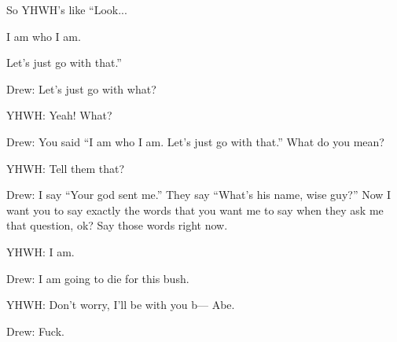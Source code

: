 {
}
{
}
{
	So YHWH's like ``Look...
	
	I am who I am.

	Let's just go with that.''

	\begin{midrash}

	Drew: Let's just go with what?
	
	YHWH: Yeah! What?

	Drew: You said ``I am who I am. Let's just go with that.'' What do you mean?
	
	YHWH: Tell them that?
	
	Drew: I say ``Your god sent me.'' They say ``What's his name, wise guy?''
		  Now I want you to say exactly the words that you want me to say when they ask me that question, ok? Say those words right now.

	YHWH: I am.

	Drew: I am going to die for this bush.

	YHWH: Don't worry, I'll be with you b--- Abe.

	Drew: Fuck.

	\end{midrash}



}

